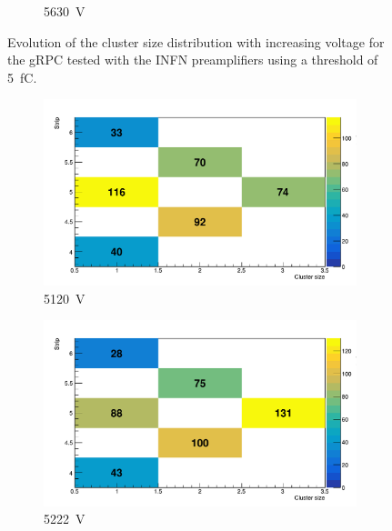 \begin{figure}[H]
\begin{subfigure}{.33\linewidth}
			\caption{\label{fig:cluster-size-1D:F} \SI{5630}{V}}
		\end{subfigure}
		\caption{\label{fig:cluster-size-1D} Evolution of the cluster size distribution with increasing voltage for the gRPC tested with the INFN preamplifiers using a threshold of \SI{5}{fC}.}
	\end{figure}
	
	\begin{figure}[H]
		\begin{subfigure}{.33\linewidth}
		    \centering
			\includegraphics[width=\linewidth]{fig/chapt6/Muon-ClS-5000-gRPC-INFN.pdf}
			\caption{\label{fig:cluster-size-2D:A} \SI{5120}{V}}
		\end{subfigure}
		\begin{subfigure}{.33\linewidth}
		    \centering
			\includegraphics[width=\linewidth]{fig/chapt6/Muon-ClS-5100-gRPC-INFN.pdf}
			\caption{\label{fig:cluster-size-2D:B} \SI{5222}{V}}
		\end{subfigure}
		\begin{subfigure}{.33\linewidth}

\end{subfigure}
\end{figure}
